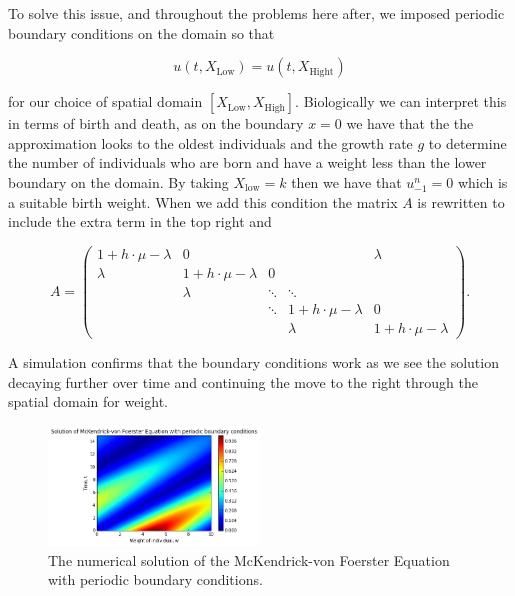 \documentclass[../main.tex]{subfiles}
\begin{document}
  To solve this issue, and throughout the problems here after, we imposed periodic boundary conditions on the domain so that

  \begin{equation}
    u(t, X_{\mathrm{Low}}) = u(t, X_{\mathrm{Hight}})
  \end{equation}

  for our choice of spatial domain $[X_{\mathrm{Low}}, X_{\mathrm{High}}]$. Biologically we can interpret this in terms of birth and death, as on the boundary $x = 0$ we have that the the approximation looks to the oldest individuals and the growth rate $g$ to determine the number of individuals who are born and have a weight less than the lower boundary on the domain. By taking $X_{\mathrm{low}} = k$ then we have that $u^n_{-1} = 0$ which is a suitable birth weight. When we add this condition the matrix $A$ is rewritten to include the extra term in the top right and

  \begin{equation}
    A = \begin{pmatrix}
      1 + h \cdot \mu - \lambda   & 0                         &         &                           & \lambda \\
      \lambda                     & 1 + h \cdot \mu - \lambda & 0       &\\
                                  & \lambda                   & \ddots  & \ddots                    & \\
                                  &                           & \ddots  & 1 + h \cdot \mu - \lambda & 0 \\
                                  &                           &         & \lambda                   & 1 + h \cdot \mu - \lambda
    \end{pmatrix}.
  \end{equation}

  A simulation confirms that the boundary conditions work as we see the solution decaying further over time and continuing the move to the right through the spatial domain for weight.

  \begin{figure}[htb]
    \centering
    \includegraphics[width=0.5\textwidth]{_assets/advection_period.png}
    \caption{\label{method:fig:advectionPeriodic} The numerical solution of the McKendrick-von Foerster Equation with periodic boundary conditions.}
  \end{figure}
\end{document}
